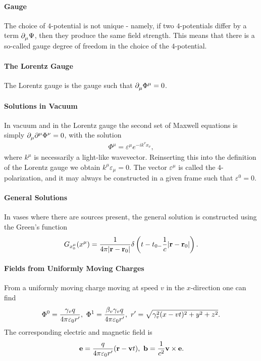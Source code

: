 \paragraph{Gauge}
The choice of $4$-potential is not unique - namely, if two $4$-potentials differ by a term $\del{\mu}{\Psi}$, then they produce the same field strength. This means that there is a so-called gauge degree of freedom in the choice of the $4$-potential.

\paragraph{The Lorentz Gauge}
The Lorentz gauge is the gauge such that $\del{\mu}{\Phi^{\mu}} = 0$.

\paragraph{Solutions in Vacuum}
In vacuum and in the Lorentz gauge the second set of Maxwell equations is simply $\del{\mu}{\del[\mu]{}{\Phi^{\nu}}} = 0$, with the solution
\begin{align*}
	\Phi^{\mu} = \varepsilon^{\mu}e^{-ik^{\nu}x_{\nu}},
\end{align*}
where $k^{\mu}$ is necessarily a light-like wavevector. Reinserting this into the definition of the Lorentz gauge we obtain $k^{\mu}\varepsilon_{\mu} = 0$. The vector $\varepsilon^{\mu}$ is called the $4$-polarization, and it may always be constructed in a given frame such that $\varepsilon^{0} = 0$.

\paragraph{General Solutions}
In vases where there are sources present, the general solution is constructed using the Green's function
\begin{align*}
	G_{x_{0}^{\mu}}(x^{\mu}) = \frac{1}{4\pi\abs{\vb{r} - \vb{r}_{0}}}\delta\left(t - t_{0 - }\frac{1}{c}\abs{\vb{r} - \vb{r}_{0}}\right).
\end{align*}

\paragraph{Fields from Uniformly Moving Charges}
From a uniformly moving charge moving at speed $v$ in the $x$-direction one can find
\begin{align*}
	\Phi^{0} = \frac{\gamma_{v}q}{4\pi\varepsilon_{0}r\p},\ \Phi^{1} = \frac{\beta_{v}\gamma_{v}q}{4\pi\varepsilon_{0}r\p},\ r\p = \sqrt{\gamma_{v}^{2}(x - vt)^{2} + y^{2} + z^{2}}.
\end{align*}
The corresponding electric and magnetic field is
\begin{align*}
	\vb{e} = \frac{q}{4\pi\varepsilon_{0}r\p}(\vb{r} - \vb{v}t),\ \vb{b} = \frac{1}{c^{2}}\vb{v}\times\vb{e}.
\end{align*}


